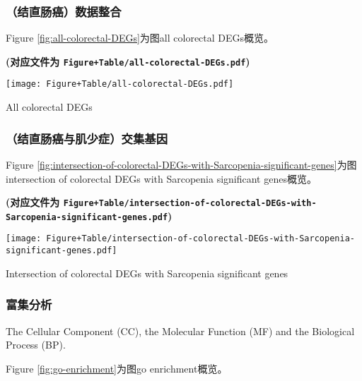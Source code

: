 \documentclass[
]{article}
\begin{document}
\hypertarget{ux7ed3ux76f4ux80a0ux764cux6570ux636eux6574ux5408}{%
\subsubsection{（结直肠癌）数据整合}\label{ux7ed3ux76f4ux80a0ux764cux6570ux636eux6574ux5408}}

Figure \ref{fig:all-colorectal-DEGs}为图all colorectal DEGs概览。

\textbf{(对应文件为 \texttt{Figure+Table/all-colorectal-DEGs.pdf})}

\def\@captype{figure}
\begin{center}
\texttt{[image: Figure+Table/all-colorectal-DEGs.pdf]}
\caption{All colorectal DEGs}\label{fig:all-colorectal-DEGs}
\end{center}

\hypertarget{ux7ed3ux76f4ux80a0ux764cux4e0eux808cux5c11ux75c7ux4ea4ux96c6ux57faux56e0}{%
\subsubsection{（结直肠癌与肌少症）交集基因}\label{ux7ed3ux76f4ux80a0ux764cux4e0eux808cux5c11ux75c7ux4ea4ux96c6ux57faux56e0}}

Figure \ref{fig:intersection-of-colorectal-DEGs-with-Sarcopenia-significant-genes}为图intersection of colorectal DEGs with Sarcopenia significant genes概览。

\textbf{(对应文件为 \texttt{Figure+Table/intersection-of-colorectal-DEGs-with-Sarcopenia-significant-genes.pdf})}

\def\@captype{figure}
\begin{center}
\texttt{[image: Figure+Table/intersection-of-colorectal-DEGs-with-Sarcopenia-significant-genes.pdf]}
\caption{Intersection of colorectal DEGs with Sarcopenia significant genes}\label{fig:intersection-of-colorectal-DEGs-with-Sarcopenia-significant-genes}
\end{center}

\hypertarget{ux5bccux96c6ux5206ux6790}{%
\subsubsection{富集分析}\label{ux5bccux96c6ux5206ux6790}}

The Cellular Component (CC), the Molecular Function (MF) and the Biological Process (BP).

Figure \ref{fig:go-enrichment}为图go enrichment概览。
\end{document}
